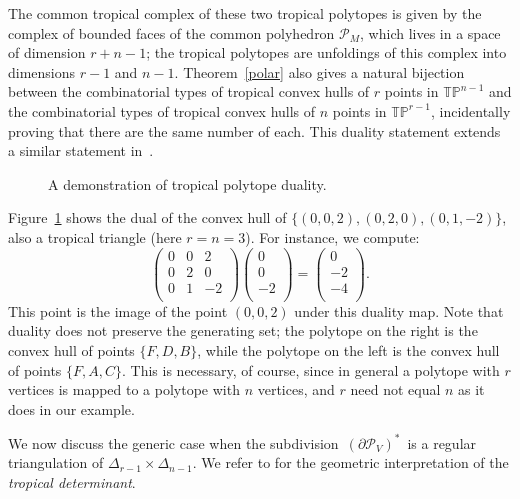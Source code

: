 \documentclass[11pt]{amsart}
\newcommand{\TP}{\mathbb{TP}}
\begin{document}
The common tropical complex of these two tropical polytopes is given by the complex of bounded faces of
the common polyhedron ${\mathcal P}_M$, which lives in a space of dimension $r+n-1$; the tropical
polytopes are unfoldings of this complex into dimensions $r-1$ and $n-1$. Theorem~\ref{polar} also gives a
natural bijection between the combinatorial types of tropical convex hulls of $r$ points in $\TP^{n-1}$
and the combinatorial types of tropical convex hulls of $n$ points in $\TP^{r-1}$, incidentally proving
that there are the same number of each. This duality statement extends a similar statement in~\cite{CGQ}.

\begin{figure}

\caption{\label{dualtriang}
A demonstration of tropical polytope duality.}
\end{figure}


Figure~\ref{dualtriang} shows the dual of the convex hull of $\{(0,0,2),(0,2,0),(0,1,-2)\}$, also a 
tropical triangle (here $r=n=3$). For instance, we compute:
\[
\left(
\begin{array}{ccc}
0 & 0 & 2 \\
0 & 2 & 0 \\
0 & 1 & -2 \\
\end{array}
\right)
\left(
\begin{array}{c}
0 \\
0 \\
-2 \\
\end{array}
\right)
= 
\left(
\begin{array}{c}
0 \\
-2 \\
-4 \\
\end{array}
\right).
\]
This point
is the image of the point $(0,0,2)$ under this duality map. Note that duality does not preserve the
generating set; the polytope on the right is the convex hull of points $\{F,D,B\}$, while the polytope on
the left is the convex hull of points $\{F,A,C\}$. This is necessary, of course, since in general a
polytope with $r$ vertices is mapped to a polytope with $n$ vertices, and $r$ need not equal $n$ as it
does in our example.

We now discuss the generic case when the subdivision
$\,(\partial {\mathcal P}_V)^*\,$ is a regular triangulation
of $\Delta_{r-1} \times \Delta_{n-1}$.
We refer to \cite[\S 5]{RGST}
for the geometric interpretation of the
\emph{tropical determinant}.
\end{document}
